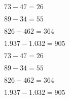 \begin{rlist}
\item $ 73-47=26 $
\item $ 89-34=55 $
\item $ 826-462=364 $
\item $ 1.937-1.032=905 $
\end{rlist}
\begin{rlist}
\item $ 73-47=26 $
\item $ 89-34=55 $
\item $ 826-462=364 $
\item $ 1.937-1.032=905 $
\end{rlist}

